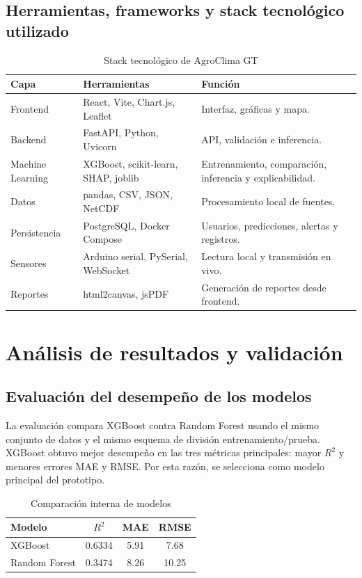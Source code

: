 \documentclass[12pt,letterpaper,oneside]{report}
\begin{document}
\section{Herramientas, frameworks y stack tecnológico utilizado}
\begin{table}[H]
\centering
\caption{Stack tecnológico de AgroClima GT}
\begin{tabularx}{\textwidth}{p{3cm}p{5cm}X}
\toprule
\textbf{Capa} & \textbf{Herramientas} & \textbf{Función} \\
\midrule
Frontend & React, Vite, Chart.js, Leaflet & Interfaz, gráficas y mapa. \\
Backend & FastAPI, Python, Uvicorn & API, validación e inferencia. \\
Machine Learning & XGBoost, scikit-learn, SHAP, joblib & Entrenamiento, comparación, inferencia y explicabilidad. \\
Datos & pandas, CSV, JSON, NetCDF & Procesamiento local de fuentes. \\
Persistencia & PostgreSQL, Docker Compose & Usuarios, predicciones, alertas y registros. \\
Sensores & Arduino serial, PySerial, WebSocket & Lectura local y transmisión en vivo. \\
Reportes & html2canvas, jsPDF & Generación de reportes desde frontend. \\
\bottomrule
\end{tabularx}
\end{table}

\chapter{Análisis de resultados y validación}

\section{Evaluación del desempeño de los modelos}
La evaluación compara XGBoost contra Random Forest usando el mismo conjunto de datos y el mismo esquema de división entrenamiento/prueba. XGBoost obtuvo mejor desempeño en las tres métricas principales: mayor $R^2$ y menores errores MAE y RMSE. Por esta razón, se selecciona como modelo principal del prototipo.

\begin{table}[H]
\centering
\caption{Comparación interna de modelos}
\begin{tabular}{lccc}
\toprule
\textbf{Modelo} & \textbf{$R^2$} & \textbf{MAE} & \textbf{RMSE} \\
\midrule
XGBoost & 0.6334 & 5.91 & 7.68 \\
Random Forest & 0.3474 & 8.26 & 10.25 \\
\bottomrule
\end{tabular}
\end{table}
\end{document}

